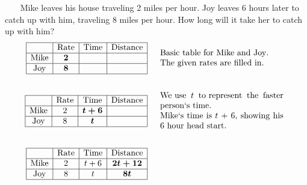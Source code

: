 \begin{example}\label{Lin89}~~~ Mike leaves his house traveling 2 miles per hour. Joy leaves 6 hours later to catch up with him, traveling 8 miles per hour. How long will it take her to catch up with him?
  \begin{eqnarray*}
    \begin{array}{|c|c|c|c|}
      \hline
      & \tmop{Rate} & \tmop{Time} & \tmop{Distance}\\
      \hline
      \tmop{Mike} & \tmmathbf{2} &  & \\
      \hline
      \tmop{Joy} & \tmmathbf{8} &  & \\
      \hline
    \end{array} &  & \begin{array}{p{0.425\textwidth}}
      \tmop{Basic} \tmop{table} \tmop{for} \tmop{Mike} \tmop{and} \tmop{Joy}.\\
      \tmop{The} \tmop{given} \tmop{rates} \tmop{are} \tmop{filled} \tmop{in}.
    \end{array}\\
    &  & \\
    \begin{array}{|c|c|c|c|}
      \hline
      & \tmop{Rate} & \tmop{Time} & \tmop{Distance}\\
      \hline
      \tmop{Mike} & 2 & \tmmathbf{t + 6} & \\
      \hline
      \tmop{Joy} & 8 & \tmmathbf{t} & \\
      \hline
    \end{array} &  & \begin{array}{p{0.425\textwidth}}
      \tmop{We~use} $t$ \tmop{to~represent} \tmop{the} \tmop{faster} \tmop{person`s} \tmop{time}.\\
      \tmop{Mike`s} \tmop{time} \tmop{is} $t~+$ 6, \tmop{showing} \tmop{his} 6
      \tmop{hour} \tmop{head} \tmop{start}.
    \end{array}\\
    &  & \\
    \begin{array}{|c|c|c|c|}
      \hline
      & \tmop{Rate} & \tmop{Time} & \tmop{Distance}\\
      \hline
      \tmop{Mike} & 2 & t + 6 & \tmmathbf{2 t + 12}\\
      \hline
      \tmop{Joy} & 8 & t & \tmmathbf{8 t}\\
      \hline
    \end{array} &  & \begin{array}{p{0.425\textwidth}}

\end{array}
\end{eqnarray*}
\end{example}
